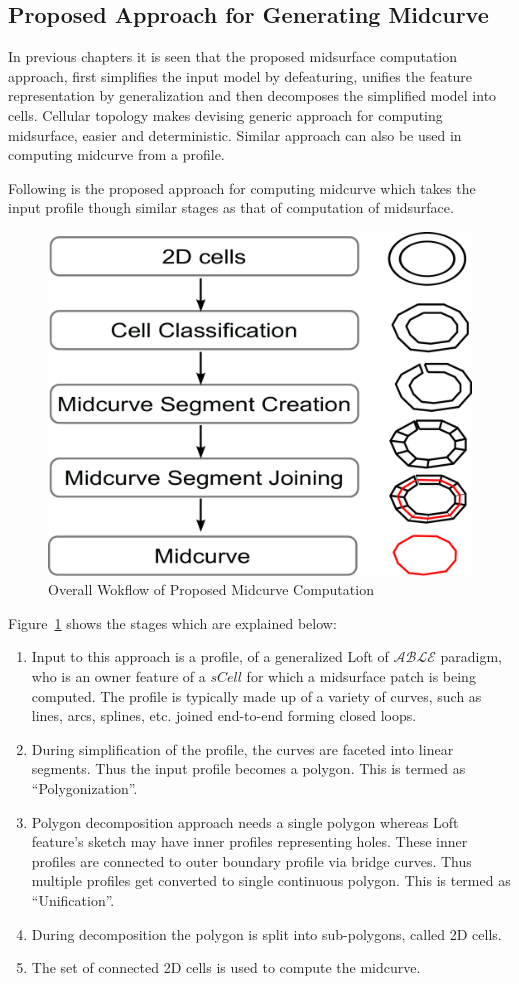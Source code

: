 \subsection{Proposed Approach for Generating Midcurve}
In previous chapters it is seen that the proposed midsurface computation approach, first simplifies the input model by defeaturing, unifies the feature representation by generalization and then decomposes the simplified model into cells. Cellular topology makes devising generic approach for computing midsurface, easier and deterministic. Similar approach can also be used in computing midcurve from a profile.

Following is the proposed approach for computing midcurve which takes the input profile though similar stages as that of computation of midsurface. 
 

\begin{figure}[h]
\centering \includegraphics[width=0.5\linewidth]{../Common/images/SystemArchitectureMidcurve_2.pdf} 
\caption{Overall Wokflow of Proposed Midcurve Computation}
\label{fig_sysarchmidcurve}
\end{figure}


Figure~\ref{fig_sysarchmidcurve} shows the stages which are explained below:

\begin{enumerate} [noitemsep,topsep=2pt,parsep=2pt,partopsep=2pt]
\item Input to this approach is a profile, of a generalized Loft of $\mathcal{ABLE}$ paradigm, who is an owner feature of a $sCell$ for which a midsurface patch is being computed. The profile is typically made up of a variety of curves, such as lines, arcs, splines, etc. joined end-to-end forming closed loops. 
\item During simplification of the profile, the curves are faceted into linear segments. Thus the input profile becomes a polygon. This is termed as ``Polygonization''.
\item Polygon decomposition approach needs a single polygon whereas Loft feature's sketch may have inner profiles representing holes. These inner profiles are connected to outer boundary profile via bridge curves. Thus multiple profiles get converted to single continuous polygon. This is termed as ``Unification''.
\item During decomposition the polygon is split into sub-polygons, called 2D cells.
\item The set of connected 2D cells is used to compute the midcurve.
\end{enumerate}

